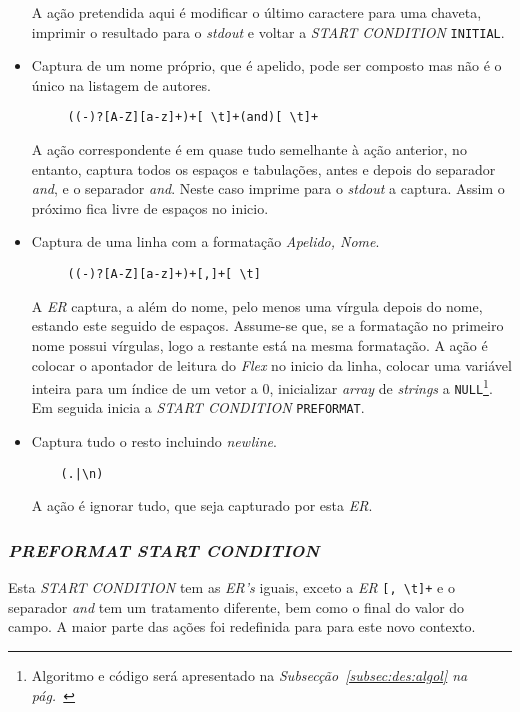 \begin{itemize}
  A ação pretendida aqui é modificar o último caractere para uma chaveta,
  imprimir o resultado para o \emph{stdout} e voltar a \emph{START CONDITION}
  \texttt{INITIAL}.

   \item Captura de um nome próprio, que é apelido, pode ser composto
          mas não é o único na listagem de autores.
    \begin{verbatim}
     ((-)?[A-Z][a-z]+)+[ \t]+(and)[ \t]+
    \end{verbatim}

    A ação correspondente é em quase tudo semelhante à ação anterior, no
    entanto, captura todos os espaços e tabulações, antes e depois do separador
    \emph{and}, e o separador \emph{and}. Neste caso imprime para o \emph{stdout}
    a captura. Assim o próximo fica livre de espaços no inicio.


  \item Captura de uma linha com a formatação \emph{Apelido, Nome}.
    \begin{verbatim}
     ((-)?[A-Z][a-z]+)+[,]+[ \t]
    \end{verbatim}
    A \emph{ER} captura, a além do nome, pelo menos uma vírgula depois do nome,
    estando este seguido de espaços. Assume-se que, se a formatação no primeiro
    nome possui vírgulas, logo a restante está na mesma formatação. A ação
    é colocar o apontador de leitura do \emph{Flex} no inicio da linha, colocar
    uma variável inteira para um índice de um vetor a 0, inicializar
    \emph{array} de \emph{strings} a \texttt{NULL}\footnote{Algoritmo e código
      será apresentado na \emph{Subsecção~\ref{subsec:des:algol} na
      pág.~\pageref{subsec:des:algol}}}.  Em seguida inicia a \emph{START
      CONDITION} \texttt{PREFORMAT}.


   \item Captura tudo o resto incluindo \emph{newline}.
    \begin{verbatim}
    (.|\n)
    \end{verbatim}
    A ação é ignorar tudo, que seja capturado por esta \emph{ER}.
\end{itemize}




\subsubsection{\emph{PREFORMAT \emph{START CONDITION}}}

Esta \emph{START CONDITION} tem as \emph{ER's} iguais, exceto a \emph{ER} \verb|[, \t]+| e 
o separador \emph{and} tem um tratamento diferente, bem como o final do valor do
campo. A maior parte das ações foi redefinida para para este novo contexto.





